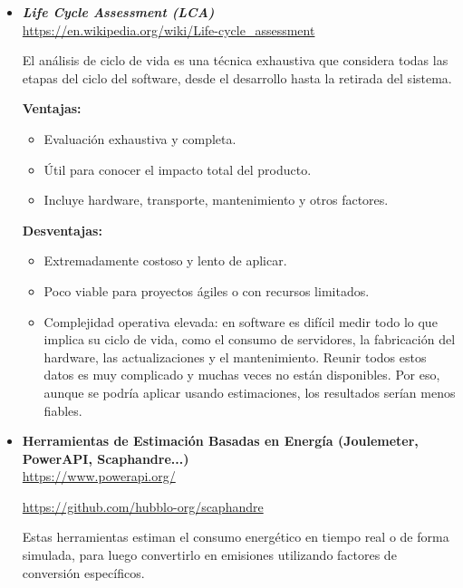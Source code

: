 \documentclass[12pt,a4paper]{report}
\begin{document}
\begin{itemize}
        \vspace{0.8em}

  \item \textit{\textbf{Life Cycle Assessment (LCA)}} \\
        \url{https://en.wikipedia.org/wiki/Life-cycle_assessment}

        El análisis de ciclo de vida es una técnica exhaustiva que considera todas las etapas del ciclo del software, desde el desarrollo hasta la retirada del sistema.

        \textbf{Ventajas:}
        \begin{itemize}
          \item Evaluación exhaustiva y completa.
          \item Útil para conocer el impacto total del producto.
          \item Incluye hardware, transporte, mantenimiento y otros factores.
        \end{itemize}
        \textbf{Desventajas:}
        \begin{itemize}
          \item Extremadamente costoso y lento de aplicar.
          \item Poco viable para proyectos ágiles o con recursos limitados.
          \item Complejidad operativa elevada: en software es difícil medir todo lo que implica su ciclo de vida, como el consumo de servidores, la fabricación del hardware, las actualizaciones y el mantenimiento. Reunir todos estos datos es muy complicado y muchas veces no están disponibles. Por eso, aunque se podría aplicar usando estimaciones, los resultados serían menos fiables.
        \end{itemize}

        \vspace{0.8em}

  \item \textbf{Herramientas de Estimación Basadas en Energía (Joulemeter, PowerAPI, Scaphandre...)} \\
        \href{https://www.powerapi.org/}{https://www.powerapi.org/}

        \href{https://github.com/hubblo-org/scaphandre}{https://github.com/hubblo-org/scaphandre}

        Estas herramientas estiman el consumo energético en tiempo real o de forma simulada, para luego convertirlo en emisiones utilizando factores de conversión específicos.


\end{itemize}
\end{document}
